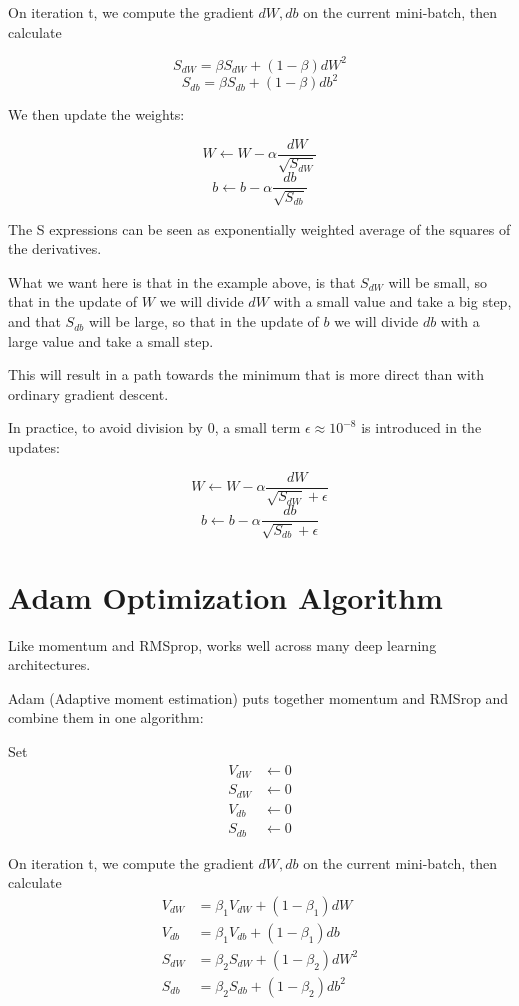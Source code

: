On iteration t, we compute the gradient $dW, db$ on the current mini-batch, then calculate

\[ S_{dW} =\beta S_{dW} + (1 - \beta) dW^2 \]
\[ S_{db} =\beta S_{db} + (1 - \beta) db^2 \]

We then update the weights:

\[ W \gets W - \alpha \frac{dW}{\sqrt{S_{dW}}} \]
\[ b \gets b - \alpha \frac{db}{\sqrt{S_{db}}} \]

The S expressions can be seen as exponentially weighted average of the squares of the derivatives.

What we want here is that in the example above, is that $S_{dW}$  will be small, so that in the update of 
$W$ we will divide $dW$ with a small value and take a big step, and that $S_{db}$  will be large,
so that in the update of $b$ we will divide $db$ with a large value and take a small step. 

This will result in a path towards the minimum that is more direct than with ordinary gradient descent.

In practice, to avoid division by $0$, a small term $\epsilon \approx 10^{-8}$  is introduced in the updates:

\[ W \gets W - \alpha \frac{dW}{\sqrt{S_{dW}} + \epsilon} \]
\[ b \gets b - \alpha \frac{db}{\sqrt{S_{db}} + \epsilon} \]





\section{Adam Optimization Algorithm}

Like momentum and RMSprop, works well across many deep learning architectures.

Adam (Adaptive moment estimation) puts together momentum and RMSrop and combine them in one algorithm:

Set 
\begin{align*}
    V_{dW} & \gets 0 \\
    S_{dW} & \gets 0 \\
    V_{db} & \gets 0 \\
    S_{db} & \gets 0
\end{align*}

On iteration t, we compute the gradient $dW, db$ on the current mini-batch, then calculate
\begin{align*}
    V_{dW} &= \beta_1 V_{dW} + (1 - \beta_1) dW \\
    V_{db} &= \beta_1 V_{db} + (1 - \beta_1) db \\
    S_{dW} &= \beta_2 S_{dW} + (1 - \beta_2) dW^2 \\
    S_{db} &= \beta_2 S_{db} + (1 - \beta_2) db^2 
\end{align*}

